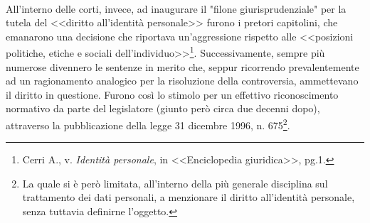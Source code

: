\\All'interno delle corti, invece, ad inaugurare il "filone giurisprudenziale" per la tutela del <<diritto all'identità personale>> furono i pretori capitolini, che emanarono una decisione che riportava un'aggressione rispetto alle <<posizioni politiche, etiche e sociali dell'individuo>>\footnote{Cerri A., v. \textit{Identità personale}, in <<Enciclopedia giuridica>>, pg.1.}. Successivamente, sempre più numerose divennero le sentenze in merito che, seppur ricorrendo prevalentemente ad un ragionamento analogico per la risoluzione della controversia, ammettevano il diritto in questione. Furono così lo stimolo per un effettivo riconoscimento normativo da parte del legislatore (giunto però circa due decenni dopo), attraverso la pubblicazione della legge 31 dicembre 1996, n. 675\footnote{La quale si è però limitata, all’interno della più generale disciplina sul trattamento dei dati personali, a menzionare il diritto all’identità personale, senza tuttavia definirne l’oggetto.}.

